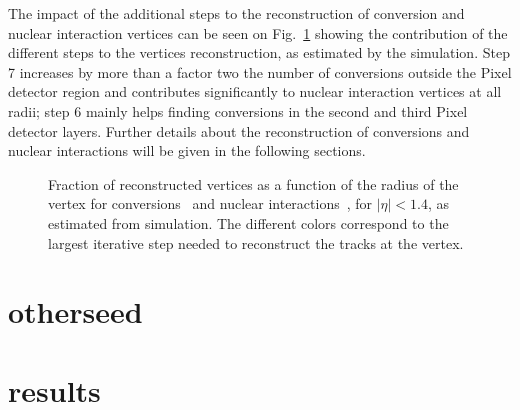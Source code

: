 \documentclass[a4paper]{jpconf}
\begin{document}
The impact of the additional steps to the reconstruction of conversion
and nuclear interaction vertices can be seen on Fig.~\ref{fig:matItTk}
showing the contribution of the different steps to the vertices
reconstruction, as estimated by the simulation.
Step 7 increases by more than a factor two the number of conversions
outside the Pixel detector region and contributes significantly to nuclear
interaction vertices at all radii; step 6 mainly helps finding
conversions in the second and third Pixel detector layers. Further details
about the reconstruction of conversions and nuclear interactions will
be given in the following sections.
\begin{figure}[!hbtp]
\centering
{}
\caption{Fraction of reconstructed vertices as a function of the radius of the vertex
for conversions~ and nuclear
interactions~, for  $|\eta|<1.4$, as estimated
from simulation. The different colors correspond to the largest
iterative step needed to reconstruct the tracks at the vertex.}
\label{fig:matItTk}
\end{figure}

\section{otherseed}

\section{results}
\end{document}

